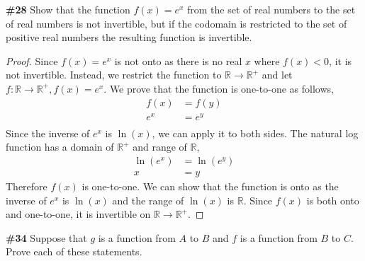 \documentclass{article}
\newcommand{\problem}[1]{\textbf{\##1}}
\newcommand{\prob}[1]{\problem{#1}}
\newcommand{\AllReals}{\mathbb{R}}
\begin{document}
\prob{28} Show that the function \(f(x) = e^x\) from the set of real numbers to the set of real numbers is not invertible, but if the codomain is restricted to the set of positive real numbers the resulting function is invertible.\begin{proof}
    Since \(f(x)=e^x\) is not onto as there is no real \(x\) where \(f(x) < 0 \), it is not invertible. Instead, we restrict the function to \(\AllReals \rightarrow \AllReals^+\) and let \(f: \AllReals \rightarrow \AllReals^+, f(x) = e^x\). We prove that the function is one-to-one as follows,
    \begin{align*}
        f(x) &= f(y)\\
        e^x &= e^y\\
    \end{align*}
    Since the inverse of \(e^x\) is \(\ln(x)\), we can apply it to both sides. The natural log function has a domain of \(\AllReals^+\) and range of \(\AllReals\),
    \begin{align*}
        \ln(e^x) &= \ln(e^y)\\
        x &= y
    \end{align*}
    Therefore \(f(x)\) is one-to-one. We can show that the function is onto as the inverse of \(e^x\) is \(\ln(x)\) and the range of \(\ln(x)\) is \(\AllReals\). Since \(f(x)\) is both onto and one-to-one, it is invertible on \(\AllReals \rightarrow \AllReals^+\).
\end{proof}
\pagebreak

\prob{34} Suppose that \(g\) is a function from \(A\) to \(B\) and \(f\) is a function from \(B\) to \(C\). Prove each of these statements.
\end{document}
